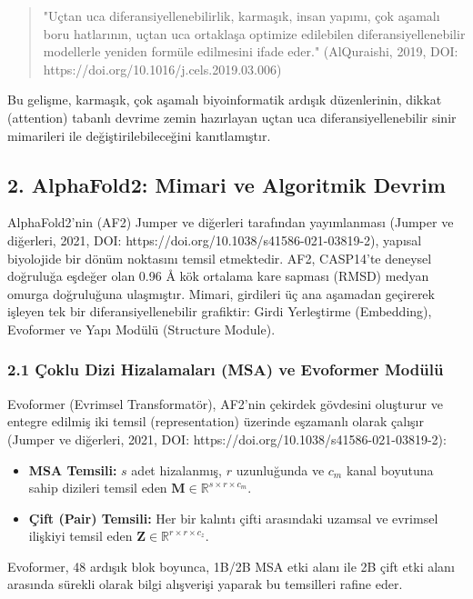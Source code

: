 \documentclass[11pt,a4paper]{article}
\begin{document}
\begin{quote}
"Uçtan uca diferansiyellenebilirlik, karmaşık, insan yapımı, çok aşamalı boru hatlarının, uçtan uca ortaklaşa optimize edilebilen diferansiyellenebilir modellerle yeniden formüle edilmesini ifade eder." (AlQuraishi, 2019, DOI: https://doi.org/10.1016/j.cels.2019.03.006)
\end{quote}
Bu gelişme, karmaşık, çok aşamalı biyoinformatik ardışık düzenlerinin, dikkat (attention) tabanlı devrime zemin hazırlayan uçtan uca diferansiyellenebilir sinir mimarileri ile değiştirilebileceğini kanıtlamıştır.

\subsection{2. AlphaFold2: Mimari ve Algoritmik Devrim}
AlphaFold2'nin (AF2) Jumper ve diğerleri tarafından yayımlanması (Jumper ve diğerleri, 2021, DOI: https://doi.org/10.1038/s41586-021-03819-2), yapısal biyolojide bir dönüm noktasını temsil etmektedir. AF2, CASP14'te deneysel doğruluğa eşdeğer olan 0.96 Å kök ortalama kare sapması (RMSD) medyan omurga doğruluğuna ulaşmıştır. Mimari, girdileri üç ana aşamadan geçirerek işleyen tek bir diferansiyellenebilir grafiktir: Girdi Yerleştirme (Embedding), Evoformer ve Yapı Modülü (Structure Module).

\subsubsection{2.1 Çoklu Dizi Hizalamaları (MSA) ve Evoformer Modülü}
Evoformer (Evrimsel Transformatör), AF2'nin çekirdek gövdesini oluşturur ve entegre edilmiş iki temsil (representation) üzerinde eşzamanlı olarak çalışır (Jumper ve diğerleri, 2021, DOI: https://doi.org/10.1038/s41586-021-03819-2):

\begin{itemize}
  \item \textbf{MSA Temsili:} \(s\) adet hizalanmış, \(r\) uzunluğunda ve \(c_m\) kanal boyutuna sahip dizileri temsil eden \(\mathbf{M} \in \mathbb{R}^{s \times r \times c_m}\).
  \item \textbf{Çift (Pair) Temsili:} Her bir kalıntı çifti arasındaki uzamsal ve evrimsel ilişkiyi temsil eden \(\mathbf{Z} \in \mathbb{R}^{r \times r \times c_z}\).
\end{itemize}
Evoformer, 48 ardışık blok boyunca, 1B/2B MSA etki alanı ile 2B çift etki alanı arasında sürekli olarak bilgi alışverişi yaparak bu temsilleri rafine eder.
\end{document}
